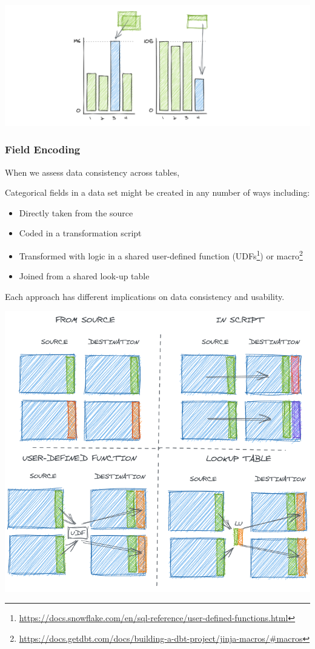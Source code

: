 \documentclass[
]{krantz}
\providecommand{\tightlist}{%
  \setlength{\itemsep}{0pt}\setlength{\parskip}{0pt}}
\renewcommand{\href}[2]{#2\footnote{\url{#1}}}
\begin{document}
\begin{center}\includegraphics[width=0.9\linewidth]{figures/data-dall/completeness-accuracy} \end{center}

\hypertarget{field-encoding}{%
\subsubsection{Field Encoding}\label{field-encoding}}

When we assess data consistency across tables,

Categorical fields in a data set might be created in any number of ways including:

\begin{itemize}
\tightlist
\item
  Directly taken from the source
\item
  Coded in a transformation script
\item
  Transformed with logic in a shared user-defined function (\href{https://docs.snowflake.com/en/sql-reference/user-defined-functions.html}{UDFs}) or \href{https://docs.getdbt.com/docs/building-a-dbt-project/jinja-macros/\#macros}{macro}
\item
  Joined from a shared look-up table
\end{itemize}

Each approach has different implications on data consistency and usability.

\begin{center}\includegraphics[width=0.9\linewidth]{figures/data-dall/field-encoding} \end{center}
\end{document}
